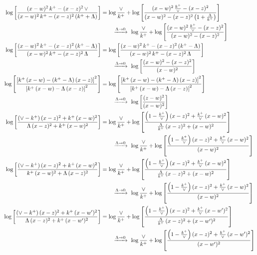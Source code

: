 \documentclass[10pt]{article}
\numberwithin{equation}{section}
\begin{document}
\begin{align}
\log{\left[\frac{(x-w)^{2}\,k^{+}-(x-z)^{2}\,\vee}{(x-w)^{2}\,k^{+} - (x-z)^{2}\,(k^{+}+\Lambda)}\right]} &= \log\frac{\vee}{k^+} + \log{\left[\frac{(x-w)^{2}\,\frac{k^{+}}{\vee}-(x-z)^{2}}{(x-w)^{2}-(x-z)^{2}\left(1+\frac{\Lambda}{k^{+}}\right)}\right]}\notag\\&\qquad\xrightarrow{\Lambda\to0}\ \log\frac{\vee}{k^+} + \log{\left[\frac{(x-w)^{2}\,\frac{k^{+}}{\vee}-(x-z)^{2}}{(x-w)^{2}-(x-z)^{2}}\right]} \notag\\
\log{\left[\frac{(x-w)^{2}\,k^{+}-(x-z)^{2}\,(k^{+}-\Lambda)}{(x-w)^{2}\,k^{+}-(x-z)^{2}\,\Lambda}\right]} &= \log{\left[\frac{(x-w)^{2}\,k^{+}-(x-z)^{2}\,(k^{+}-\Lambda)}{(x-w)^{2}\,k^{+}-(x-z)^{2}\,\Lambda}\right]}\notag\\&\qquad\xrightarrow{\Lambda\to0}\ \log{\left[\frac{(x-w)^{2}-(x-z)^{2}}{(x-w)^{2}}\right]} \notag\\
\log{\left[\frac{\left[k^{+}\,(x-w)-(k^{+}-\Lambda)\,(x-z)\right]^{2}}{\left[k^{+}\,(x-w)-\Lambda\,(x-z)\right]^{2}}\right]} &= \log{\left[\frac{\left[k^{+}\,(x-w)-(k^{+}-\Lambda)\,(x-z)\right]^{2}}{\left[k^{+}\,(x-w)-\Lambda\,(x-z)\right]^{2}}\right]}\notag\\&\qquad\xrightarrow{\Lambda\to0}\ \log{\left[\frac{(z-w)^{2}}{(x-w)^{2}}\right]} \notag\\
\log{\left[\frac{(\vee-k^{+})\,(x-z)^{2}+k^{+}\,(x-w)^{2}}{\Lambda\, (x-z)^{2} + k^{+}\,(x-w)^{2}}\right]} &= \log\frac{\vee}{k^+} + \log{\left[\frac{\left(1-\frac{k^{+}}{\vee}\right)(x-z)^{2}+\frac{k^{+}}{\vee}\,(x-w)^{2}}{\frac{\Lambda}{k^{+}}\,(x-z)^{2}+(x-w)^{2}}\right]}\notag\\&\qquad\xrightarrow{\Lambda\to0}\ \log\frac{\vee}{k^+} + \log{\left[\frac{\left(1-\frac{k^{+}}{\vee}\right)(x-z)^{2}+\frac{k^{+}}{\vee}\,(x-w)^{2}}{(x-w)^{2}}\right]} \notag\\
\log{\left[\frac{(\vee-k^{+})\,(x-z)^{2}+k^{+}\,(x-w)^{2}}{k^{+}\,(x-w)^{2}+\Lambda\, (x-z)^{2}}\right]} &= \log\frac{\vee}{k^+} + \log{\left[\frac{\left(1-\frac{k^{+}}{\vee}\right)(x-z)^{2}+\frac{k^{+}}{\vee}\,(x-w)^{2}}{\frac{\Lambda}{k^{+}}\,(x-z)^{2}+(x-w)^{2}}\right]}\notag\\&\qquad\xrightarrow{\Lambda\to0}\ \log\frac{\vee}{k^+} + \log{\left[\frac{\left(1-\frac{k^{+}}{\vee}\right)(x-z)^{2}+\frac{k^{+}}{\vee}\,(x-w)^{2}}{(x-w)^{2}}\right]} \notag\\
\log{\left[\frac{(\vee-k^{+})\,(x-z)^{2}+k^{+}\,(x-w')^{2}}{\Lambda\, (x-z)^{2} + k^{+}\,(x-w')^{2}}\right]} &= \log\frac{\vee}{k^+} + \log{\left[\frac{\left(1-\frac{k^{+}}{\vee}\right)(x-z)^{2}+\frac{k^{+}}{\vee}\,(x-w')^{2}}{\frac{\Lambda}{k^{+}}\,(x-z)^{2}+(x-w')^{2}}\right]}\notag\\&\qquad\xrightarrow{\Lambda\to0}\ \log\frac{\vee}{k^+} + \log{\left[\frac{\left(1-\frac{k^{+}}{\vee}\right)(x-z)^{2}+\frac{k^{+}}{\vee}\,(x-w')^{2}}{(x-w')^{2}}\right]} \notag\\

\end{align}
\end{document}
